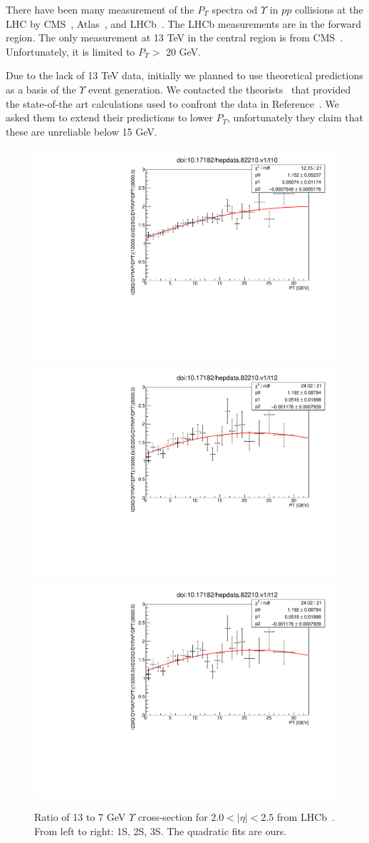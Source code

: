 \documentclass[12pt]{article}
\begin{document}
There have been many measurement of the $P_T$ spectra od $\Upsilon$ in $pp$ collisions
at the LHC by CMS~\cite{Khachatryan:2010zg, Chatrchyan:2013yna, Khachatryan:2015qpa, Sirunyan:2017qdw},
Atlas~\cite{Aad:2011xv, Aad:2012dlq},
  and LHCb~\cite{Aaij:2018pfp, Aaij:2015awa, Aaij:2014nwa, Aaij:2013yaa, LHCb:2012aa}.
  The LHCb measurements are in the forward region.  The only measurement at 13 TeV
  in the central region is from CMS~\cite{Sirunyan:2017qdw}.  Unfortunately, it is limited
  to $P_T >$ 20 GeV.

  Due to the lack of 13 TeV data, initially we planned to use theoretical predictions
  as a basis of the $\Upsilon$ event generation.
  We contacted the theorists~\cite{Han:2014kxa}
  that provided the state-of-the art calculations used to
  confront the data in Reference~\cite{Sirunyan:2017qdw}.  We
  asked them to extend their predictions to lower $P_T$, unfortunately they claim that these
  are unreliable below 15 GeV.

\begin{figure}
\begin{adjustwidth}{-3cm}{-3cm}
\centering
\includegraphics[width=0.32\linewidth]{../oniaDirect/LHCB-13-TeV/ups1s-13to7eta20to25.pdf}
\includegraphics[width=0.32\linewidth]{../oniaDirect/LHCB-13-TeV/ups3s-13to7eta20to25.pdf}
\includegraphics[width=0.32\linewidth]{../oniaDirect/LHCB-13-TeV/ups3s-13to7eta20to25.pdf}
\end{adjustwidth}
\caption{\protect Ratio of 13 to 7 GeV $\Upsilon$ cross-section for $2.0 < |\eta| < 2.5$
  from LHCb~\cite{Aaij:2018pfp}.  From left to right: 1S, 2S, 3S. 
  The quadratic fits are ours.}
\label{fig:upsratio}
\end{figure}
\end{document}
